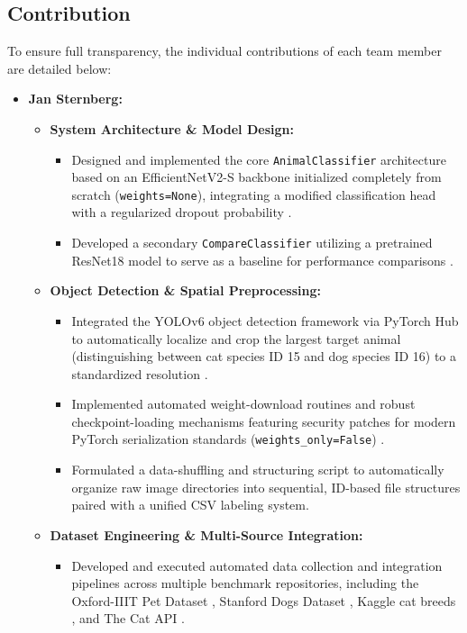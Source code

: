 \subsection{Contribution}

To ensure full transparency, the individual contributions of each team member are detailed below:

\begin{itemize}
    \item \textbf{Jan Sternberg:}
    \begin{itemize}
        \item \textbf{System Architecture \& Model Design:}
        \begin{itemize}
            \item Designed and implemented the core \texttt{AnimalClassifier} architecture based on an EfficientNetV2-S backbone initialized completely from scratch (\texttt{weights=None}), integrating a modified classification head with a regularized dropout probability \cite{tan2021efficientnetv2}.
            \item Developed a secondary \texttt{CompareClassifier} utilizing a pretrained ResNet18 model to serve as a baseline for performance comparisons \cite{kornblith2019transfer}.
        \end{itemize}
        \item \textbf{Object Detection \& Spatial Preprocessing:}
        \begin{itemize}
            \item Integrated the YOLOv6 object detection framework via PyTorch Hub to automatically localize and crop the largest target animal (distinguishing between cat species ID 15 and dog species ID 16) to a standardized resolution \cite{li2022yolov6}.
            \item Implemented automated weight-download routines and robust checkpoint-loading mechanisms featuring security patches for modern PyTorch serialization standards (\texttt{weights\_only=False}) \cite{paszke2019pytorch}.
            \item Formulated a data-shuffling and structuring script to automatically organize raw image directories into sequential, ID-based file structures paired with a unified CSV labeling system.
        \end{itemize}
        \item \textbf{Dataset Engineering \& Multi-Source Integration:}
        \begin{itemize}
            \item Developed and executed automated data collection and integration pipelines across multiple benchmark repositories, including the Oxford-IIIT Pet Dataset \cite{parkhi2012catsdogs}, Stanford Dogs Dataset \cite{khosla2011novel}, Kaggle cat breeds \cite{deng2009imagenet}, and The Cat API \cite{cat_api}.

\end{itemize}
\end{itemize}
\end{itemize}
